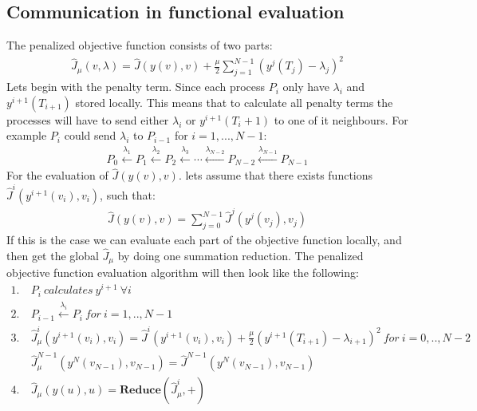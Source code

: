 \subsection{Communication in functional evaluation}
The penalized objective function consists of two parts:
\begin{align*}
\hat J_{\mu}(v,\lambda) = \hat{J}(y(v),v) + \frac{\mu}{2}\sum_{j=1}^{N-1}(y^{j}(T_j)-\lambda_j)^2
\end{align*}
Lets begin with the penalty term. Since each process $P_i$ only have $\lambda_i$ and $y^{i+1}(T_{i+1})$ stored locally. This means that to calculate all penalty terms the processes will have to send either $\lambda_i$ or $y^{i+1}(T_i+1)$ to one of it neighbours. For example $P_i$ could send $\lambda_i$ to $P_{i-1}$ for $i=1,...,N-1$:
\begin{align*}
P_0\overset{\lambda_1}{\longleftarrow}P_1\overset{\lambda_2}{\longleftarrow}P_2 \overset{\lambda_3}{\longleftarrow}\cdots \overset{\lambda_{N-2}}{\longleftarrow}P_{N-2}\overset{\lambda_{N-1}}{\longleftarrow}P_{N-1}
\end{align*} 
For the evaluation of $ \hat{J}(y(v),v)$. lets assume that there exists functions $\hat{J}^i(y^{i+1}(v_i),v_i)$, such that:
\begin{align*}
\hat{J}(y(v),v)= \sum_{j=0}^{N-1}\hat{J}^j(y^j(v_j),v_j)
\end{align*}
If this is the case we can evaluate each part of the objective function locally, and then get the global $\hat{J}_{\mu}$ by doing one summation reduction. The penalized objective function evaluation algorithm will then look like the following:
\begin{align*}
1. \ &P_i \ \textit{calculates} \ y^{i+1} \ \forall i \\
2. \ &P_{i-1}\overset{\lambda_i}{\longleftarrow}P_{i} \ \textit{for} \ i=1,..,N-1 \\
3. \ &\hat{J}_{\mu}^i(y^{i+1}(v_i),v_i) = \hat{J}^i(y^{i+1}(v_i),v_i) + \frac{\mu}{2}(y^{i+1}(T_{i+1})-\lambda_{i+1})^2 \ \textit{for} \ i=0,..,N-2 \\
&\hat{J}_{\mu}^{N-1}(y^{N}(v_{N-1}),v_{N-1})= \hat{J}^{N-1}(y^{N}(v_{N-1}),v_{N-1}) \\
4. \ &\hat{J}_{\mu}(y(u),u) = \textbf{Reduce}(\hat{J}_{\mu}^i,+)
\end{align*}
